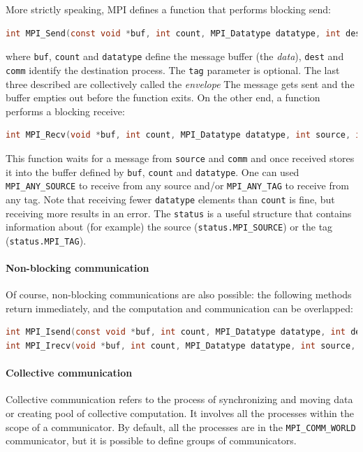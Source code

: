 \documentclass{article}
\begin{document}
More strictly speaking, MPI defines a function that performs blocking send:
\begin{lstlisting}[language=C]
int MPI_Send(const void *buf, int count, MPI_Datatype datatype, int dest, int tag, MPI_Comm comm)
\end{lstlisting}
where \lstinline{buf}, \lstinline{count} and \lstinline{datatype} define the message buffer (the \textit{data}), \lstinline{dest} and \lstinline{comm} identify the destination process. The \lstinline{tag} parameter is optional. The last three described are collectively called the \textit{envelope} The message gets sent and the buffer empties out before the function exits.
On the other end, a function performs a blocking receive:
\begin{lstlisting}[language=C]
int MPI_Recv(void *buf, int count, MPI_Datatype datatype, int source, int tag, MPI_Comm comm, MPI_Status *status)
\end{lstlisting}
This function waits for a message from \lstinline{source} and \lstinline{comm} and once received stores it into the buffer defined by \lstinline{buf}, \lstinline{count} and \lstinline{datatype}. One can used \lstinline{MPI_ANY_SOURCE} to receive from any source and/or \lstinline{MPI_ANY_TAG} to receive from any tag. Note that receiving fewer \lstinline{datatype} elements than \lstinline{count} is fine, but receiving more results in an error. The \lstinline{status} is a useful structure that contains information about (for example) the source (\lstinline{status.MPI_SOURCE}) or the tag (\lstinline{status.MPI_TAG}).

\paragraph{Non-blocking communication}
Of course, non-blocking communications are also possible: the following methods return immediately, and the computation and communication can be overlapped:
\begin{lstlisting}[language=C]
int MPI_Isend(const void *buf, int count, MPI_Datatype datatype, int dest, int tag, MPI_Comm comm, MPI_Request *request)
int MPI_Irecv(void *buf, int count, MPI_Datatype datatype, int source, int tag, MPI_Comm comm, MPI_Request *request)
\end{lstlisting}

\paragraph{Collective communication}
Collective communication refers to the process of synchronizing and moving data or creating pool of collective computation. It involves all the processes within the scope of a communicator. By default, all the processes are in the \lstinline{MPI_COMM_WORLD} communicator, but it is possible to define groups of communicators.
\end{document}
